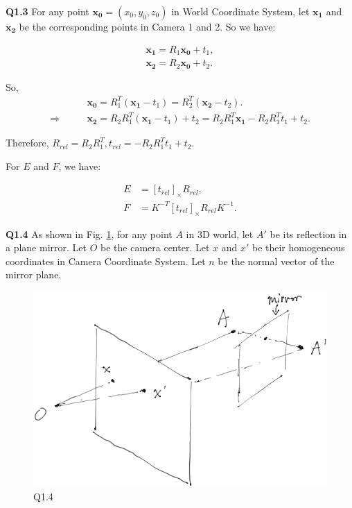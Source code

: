 \documentclass[
  course = {{16-720B Computer Vision}},
  quartile = {{1}},
  assignment = 5\ -\ 3D\ Reconstruction\ \&\ Photometric\ Stereo,
  name = {{Kangle Deng}},
  email = {{kangled@andrew.cmu.edu}},
  firstexercise = 1
]{aga-homework}
\begin{document}
\noindent\textbf{Q1.3} For any point $\mathbf{x_0} = (x_0,y_0,z_0)$ in World Coordinate System, let $\mathbf{x_1}$ and $\mathbf{x_2}$ be the corresponding points in Camera 1 and 2. So we have:

\begin{equation*}
    \begin{aligned}
        \mathbf{x_1} = R_1 \mathbf{x_0} + t_1, \\
        \mathbf{x_2} = R_2 \mathbf{x_0} + t_2.
    \end{aligned}
\end{equation*}

So,
\begin{equation*}
    \begin{aligned}
      &  \mathbf{x_0} = R_1^T(\mathbf{x_1} - t_1) = R_2^T(\mathbf{x_2} - t_2). \\
      \Rightarrow \qquad & \mathbf{x_2} = R_2R_1^T(\mathbf{x_1} - t_1) + t_2 = R_2R_1^T\mathbf{x_1} - R_2R_1^Tt_1 + t_2.
    \end{aligned}
\end{equation*}

Therefore, $R_{rel} = R_2R_1^T, t_{rel} = - R_2R_1^Tt_1 + t_2$.

For $E$ and $F$, we have:

\begin{equation*}
    \begin{aligned}
      E & = [t_{rel}]_\times R_{rel}, \\
      F & = K^{-T}[t_{rel}]_\times R_{rel}K^{-1}.
    \end{aligned}
\end{equation*}

\noindent \textbf{Q1.4} As shown in Fig. \ref{fig:cv_hw5_q14}, for any point $A$ in 3D world, let $A'$ be its reflection in a plane mirror. Let $O$ be the camera center. Let $x$ and $x'$ be their homogeneous coordinates in Camera Coordinate System. Let $n$ be the normal vector of the mirror plane. 

\begin{figure}
    \centering
    \includegraphics[width=.4\textwidth]{CV/fig/hw5/hw5_14.jpeg}
    \caption{Q1.4}
    \label{fig:cv_hw5_q14}
\end{figure}
\end{document}
